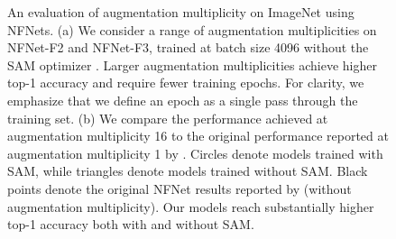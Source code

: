 \documentclass{article}
\begin{document}
\begin{table}[]
\vskip -1mm
\caption{NFNet-F3 and F5, trained on ImageNet at augmentation multiplicity 16 with SAM at batch size 4096. We significantly exceed the original performance reported by \citet{brock2021high}.}
\label{table:sam}
\centering
{}
\vskip -2mm
\end{table}

\begin{figure}[t]
\centering
  \vskip -3mm
\vskip -2mm
\caption{An evaluation of augmentation multiplicity on ImageNet using NFNets. (a) We consider a range of augmentation multiplicities on NFNet-F2 and NFNet-F3, trained at batch size 4096 without the SAM optimizer \citep{foret2020sharpness}. Larger augmentation multiplicities achieve higher top-1 accuracy and require fewer training epochs. For clarity, we emphasize that we define an epoch as a single pass through the training set. (b) We compare the performance achieved at augmentation multiplicity 16 to the original performance reported at augmentation multiplicity 1 by \citet{brock2021high}. Circles denote models trained with SAM, while triangles denote models trained without SAM. Black points denote the original NFNet results reported by \citet{brock2021high} (without augmentation multiplicity). Our models reach substantially higher top-1 accuracy both with and without SAM. }
\label{fig:NFNets_params_and_compute}
\vskip -2mm
\end{figure}
\end{document}
